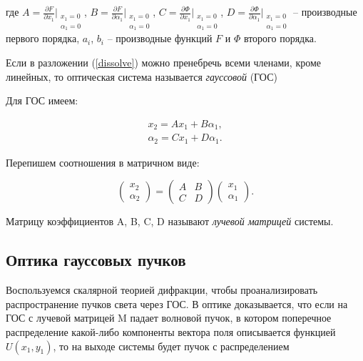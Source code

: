 \documentclass[a4paper,12pt]{article}
\begin{document}
где $A = \frac{\partial F}{\partial x_1}\Bigr|_{\substack{x_1=0\\\alpha_1=0}}$, $B = \frac{\partial F}{\partial \alpha_1}\Bigr|_{\substack{x_1=0\\\alpha_1=0}}$, $C = \frac{\partial \Phi}{\partial x_1}\Bigr|_{\substack{x_1=0\\\alpha_1=0}}$, $D = \frac{\partial \Phi}{\partial \alpha_1}\Bigr|_{\substack{x_1=0\\\alpha_1=0}}$ -- производные первого порядка, $a_i$, $b_i$ -- производные функций $F$ и $\Phi$ второго порядка.

Если в разложении (\ref{dissolve}) можно пренебречь всеми членами, кроме линейных, то оптическая система называется \textit{гауссовой} (ГОС)

Для ГОС имеем:

\begin{equation}
\begin{split}
    x_2 = Ax_1 + B\alpha_1,\\
    \alpha_2 = Cx_1 + D\alpha_1.
\end{split}
\end{equation}

Перепишем соотношения в матричном виде:

\begin{equation}
    \begin{pmatrix}
        x_2\\
        \alpha_2
    \end{pmatrix}
    =
    \begin{pmatrix}
        A & B\\
        C & D
    \end{pmatrix}
    \begin{pmatrix}
        x_1\\
        \alpha_1
    \end{pmatrix}.
\end{equation}

Матрицу коэффициентов A, B, C, D называют \textit{лучевой матрицей} системы.

\subsection{Оптика гауссовых пучков}

Воспользуемся скалярной теорией дифракции, чтобы проанализировать распространение пучков света через ГОС.
В оптике доказывается, что если на ГОС с лучевой матрицей M падает волновой пучок, в котором поперечное распределение какой-либо компоненты вектора поля описывается функцией $U(x_1, y_1)$, то на выходе системы будет пучок с распределением
\end{document}
